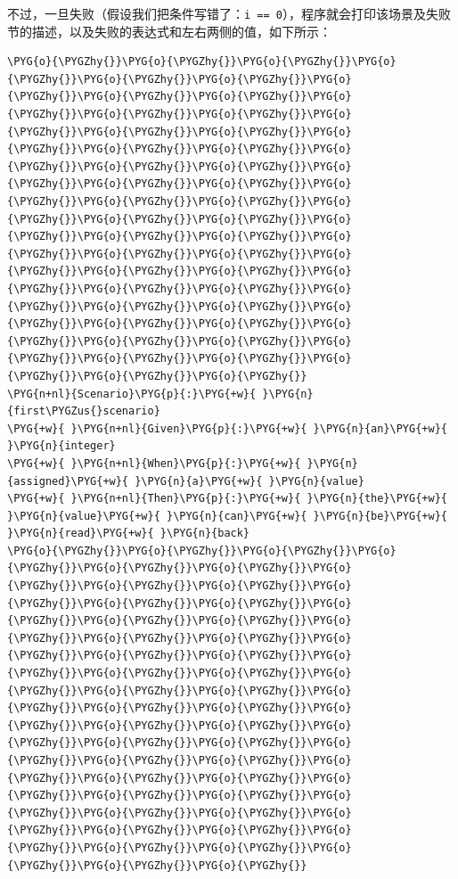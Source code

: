 
不过，一旦失败（假设我们把条件写错了：\texttt{i == 0}），程序就会打印该场景及失败节的描述，以及失败的表达式和左右两侧的值，如下所示：



\begin{codeblockbg}
\begin{Verbatim}[commandchars=\\\{\},breaklines=true,breakanywhere=true,fontsize=\codefont,xleftmargin=17bp]
\PYG{o}{\PYGZhy{}}\PYG{o}{\PYGZhy{}}\PYG{o}{\PYGZhy{}}\PYG{o}{\PYGZhy{}}\PYG{o}{\PYGZhy{}}\PYG{o}{\PYGZhy{}}\PYG{o}{\PYGZhy{}}\PYG{o}{\PYGZhy{}}\PYG{o}{\PYGZhy{}}\PYG{o}{\PYGZhy{}}\PYG{o}{\PYGZhy{}}\PYG{o}{\PYGZhy{}}\PYG{o}{\PYGZhy{}}\PYG{o}{\PYGZhy{}}\PYG{o}{\PYGZhy{}}\PYG{o}{\PYGZhy{}}\PYG{o}{\PYGZhy{}}\PYG{o}{\PYGZhy{}}\PYG{o}{\PYGZhy{}}\PYG{o}{\PYGZhy{}}\PYG{o}{\PYGZhy{}}\PYG{o}{\PYGZhy{}}\PYG{o}{\PYGZhy{}}\PYG{o}{\PYGZhy{}}\PYG{o}{\PYGZhy{}}\PYG{o}{\PYGZhy{}}\PYG{o}{\PYGZhy{}}\PYG{o}{\PYGZhy{}}\PYG{o}{\PYGZhy{}}\PYG{o}{\PYGZhy{}}\PYG{o}{\PYGZhy{}}\PYG{o}{\PYGZhy{}}\PYG{o}{\PYGZhy{}}\PYG{o}{\PYGZhy{}}\PYG{o}{\PYGZhy{}}\PYG{o}{\PYGZhy{}}\PYG{o}{\PYGZhy{}}\PYG{o}{\PYGZhy{}}\PYG{o}{\PYGZhy{}}\PYG{o}{\PYGZhy{}}\PYG{o}{\PYGZhy{}}\PYG{o}{\PYGZhy{}}\PYG{o}{\PYGZhy{}}\PYG{o}{\PYGZhy{}}\PYG{o}{\PYGZhy{}}\PYG{o}{\PYGZhy{}}\PYG{o}{\PYGZhy{}}\PYG{o}{\PYGZhy{}}\PYG{o}{\PYGZhy{}}\PYG{o}{\PYGZhy{}}\PYG{o}{\PYGZhy{}}\PYG{o}{\PYGZhy{}}\PYG{o}{\PYGZhy{}}\PYG{o}{\PYGZhy{}}\PYG{o}{\PYGZhy{}}\PYG{o}{\PYGZhy{}}\PYG{o}{\PYGZhy{}}
\PYG{n+nl}{Scenario}\PYG{p}{:}\PYG{+w}{ }\PYG{n}{first\PYGZus{}scenario}
\PYG{+w}{ }\PYG{n+nl}{Given}\PYG{p}{:}\PYG{+w}{ }\PYG{n}{an}\PYG{+w}{ }\PYG{n}{integer}
\PYG{+w}{ }\PYG{n+nl}{When}\PYG{p}{:}\PYG{+w}{ }\PYG{n}{assigned}\PYG{+w}{ }\PYG{n}{a}\PYG{+w}{ }\PYG{n}{value}
\PYG{+w}{ }\PYG{n+nl}{Then}\PYG{p}{:}\PYG{+w}{ }\PYG{n}{the}\PYG{+w}{ }\PYG{n}{value}\PYG{+w}{ }\PYG{n}{can}\PYG{+w}{ }\PYG{n}{be}\PYG{+w}{ }\PYG{n}{read}\PYG{+w}{ }\PYG{n}{back}
\PYG{o}{\PYGZhy{}}\PYG{o}{\PYGZhy{}}\PYG{o}{\PYGZhy{}}\PYG{o}{\PYGZhy{}}\PYG{o}{\PYGZhy{}}\PYG{o}{\PYGZhy{}}\PYG{o}{\PYGZhy{}}\PYG{o}{\PYGZhy{}}\PYG{o}{\PYGZhy{}}\PYG{o}{\PYGZhy{}}\PYG{o}{\PYGZhy{}}\PYG{o}{\PYGZhy{}}\PYG{o}{\PYGZhy{}}\PYG{o}{\PYGZhy{}}\PYG{o}{\PYGZhy{}}\PYG{o}{\PYGZhy{}}\PYG{o}{\PYGZhy{}}\PYG{o}{\PYGZhy{}}\PYG{o}{\PYGZhy{}}\PYG{o}{\PYGZhy{}}\PYG{o}{\PYGZhy{}}\PYG{o}{\PYGZhy{}}\PYG{o}{\PYGZhy{}}\PYG{o}{\PYGZhy{}}\PYG{o}{\PYGZhy{}}\PYG{o}{\PYGZhy{}}\PYG{o}{\PYGZhy{}}\PYG{o}{\PYGZhy{}}\PYG{o}{\PYGZhy{}}\PYG{o}{\PYGZhy{}}\PYG{o}{\PYGZhy{}}\PYG{o}{\PYGZhy{}}\PYG{o}{\PYGZhy{}}\PYG{o}{\PYGZhy{}}\PYG{o}{\PYGZhy{}}\PYG{o}{\PYGZhy{}}\PYG{o}{\PYGZhy{}}\PYG{o}{\PYGZhy{}}\PYG{o}{\PYGZhy{}}\PYG{o}{\PYGZhy{}}\PYG{o}{\PYGZhy{}}\PYG{o}{\PYGZhy{}}\PYG{o}{\PYGZhy{}}\PYG{o}{\PYGZhy{}}\PYG{o}{\PYGZhy{}}\PYG{o}{\PYGZhy{}}\PYG{o}{\PYGZhy{}}\PYG{o}{\PYGZhy{}}\PYG{o}{\PYGZhy{}}\PYG{o}{\PYGZhy{}}\PYG{o}{\PYGZhy{}}\PYG{o}{\PYGZhy{}}\PYG{o}{\PYGZhy{}}\PYG{o}{\PYGZhy{}}\PYG{o}{\PYGZhy{}}\PYG{o}{\PYGZhy{}}\PYG{o}{\PYGZhy{}}

\end{Verbatim}
\end{codeblockbg}
